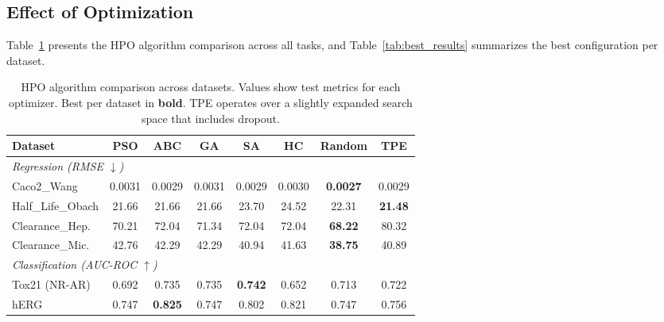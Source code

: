 \documentclass[journal]{IEEEtran}
\begin{document}
\subsection{Effect of Optimization}
\label{sec:optimization}

Table~\ref{tab:hpo_results} presents the HPO algorithm comparison across all tasks, and Table~\ref{tab:best_results} summarizes the best configuration per dataset.

\begin{table}[!t]
\centering
\caption{HPO algorithm comparison across datasets. Values show test metrics for each optimizer. Best per dataset in \textbf{bold}. TPE operates over a slightly expanded search space that includes dropout.}
\label{tab:hpo_results}
\scriptsize
\begin{tabular}{lccccccc}
\toprule
\textbf{Dataset} & \textbf{PSO} & \textbf{ABC} & \textbf{GA} & \textbf{SA} & \textbf{HC} & \textbf{Random} & \textbf{TPE} \\
\midrule
\multicolumn{8}{l}{\emph{Regression (RMSE $\downarrow$)}} \\
\midrule
Caco2\_Wang & 0.0031 & 0.0029 & 0.0031 & 0.0029 & 0.0030 & \textbf{0.0027} & 0.0029 \\
Half\_Life\_Obach & 21.66 & 21.66 & 21.66 & 23.70 & 24.52 & 22.31 & \textbf{21.48} \\
Clearance\_Hep. & 70.21 & 72.04 & 71.34 & 72.04 & 72.04 & \textbf{68.22} & 80.32 \\
Clearance\_Mic. & 42.76 & 42.29 & 42.29 & 40.94 & 41.63 & \textbf{38.75} & 40.89 \\
\midrule
\multicolumn{8}{l}{\emph{Classification (AUC-ROC $\uparrow$)}} \\
\midrule
Tox21 (NR-AR) & 0.692 & 0.735 & 0.735 & \textbf{0.742} & 0.652 & 0.713 & 0.722 \\
hERG & 0.747 & \textbf{0.825} & 0.747 & 0.802 & 0.821 & 0.747 & 0.756 \\
\bottomrule
\end{tabular}
\end{table}
\end{document}
